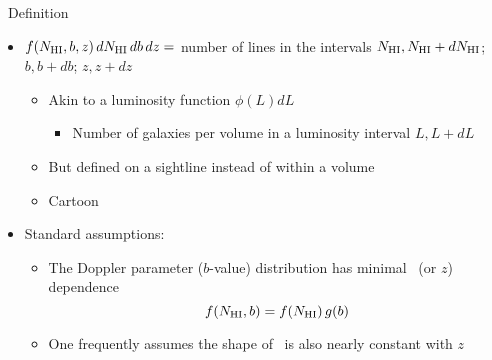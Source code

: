 \documentclass[12pt,letterpaper]{article}
\begin{document}
\begin{Aenumerate}
{\bf \item \fnhi\ Definition}
 \begin{itemize}
 \item $f(N_{\rm HI}, b, z) \, dN_{\rm HI} \, db \, dz = $ number of lines in the intervals
 $N_{\rm HI}, N_{\rm HI}+dN_{\rm HI}$; $b, b+db$; $z, z+dz$
 	\begin{itemize}
 	\item Akin to a luminosity function $\phi(L) dL$
 		\begin{itemize}
 		\item Number of galaxies per volume in a luminosity interval $L, L+dL$
 		\end{itemize}
 	\item But defined on a sightline instead of within a volume
	\item Cartoon
	\end{itemize}
\item Standard assumptions:
	\begin{itemize}
	\item The Doppler parameter ($b$-value) distribution has 
	minimal \nhi\ (or $z$) dependence
 		\begin{equation}
 		f(N_{\rm HI},b) = f(N_{\rm HI}) \, g(b)
 		\end{equation}
	\item One frequently assumes the shape of \fnhi\ is also 
	nearly constant with $z$
	\end{itemize}

 \end{itemize}


\end{Aenumerate}
\end{document}
